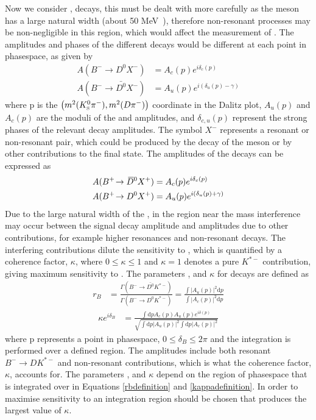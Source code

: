 Now we consider \decay{\Bm}{\D\Kstarm}, \decay{\Kstarm}{\KS\pim} decays, this must be dealt with more carefully as the \Kstarm meson has a large natural width (about 50 MeV~\cite{PDG2016}), therefore non-resonant \decay{\Bm}{\D\KS\pim} processes may be non-negligible in this region, which would affect the measurement of \Pgamma. The amplitudes and phases of the different decays would be different at each point in \decay{\Bm}{\D\KS\pim} phasespace, as given by
\begin{align*}
A(B^- \to D^0 X^-) &= A_c(p) e^{i\delta_c(p)} \\
A(B^- \to \bar{D^0} X^-) &= A_u(p) e^{i(\delta_u(p) - \gamma)}
\end{align*}
where p is the $\left(m^2({{K}^0_{\mathrm{ \scriptscriptstyle S}}}{{\pi}^-}),m^2({D}{{\pi}^-})\right)$ coordinate in the \decay{\Bm}{\D\KS\pim} Dalitz plot, $A_u(p)$ and $A_c(p)$ are the moduli of the \decay{\bquark}{\uquark} and \decay{\bquark}{\cquark} amplitudes, and $\delta_{c,u}(p)$ represent the strong phases of the relevant decay amplitudes. The symbol $X^-$ represents a resonant or non-resonant \KS\pim pair, which could be produced by the decay of the \Kstarm meson or by other contributions to the \decay{\Bm}{\D\KS\pim} final state. The amplitudes of the \Bp decays can be expressed as 
\begin{align*}
A({{{B}^+}}\!\rightarrow {\ensuremath{{\kern 0.2em\overline{\kern -0.2em D}{}}{}^0}} X^+) &= A_c(p) e^{i\delta_c(p)} \\
A({{{B}^+}}\!\rightarrow {\ensuremath{{D}^0}} X^+) &= A_u(p) e^{i(\delta_u(p) + \gamma)}
\end{align*}
Due to the large natural width of the \Kstarm, in the region near the \Kstarm mass interference may occur between the signal \Kstarm decay amplitude and amplitudes due to other \decay{\Bm}{\D\KS\pim} contributions, for example higher \KS\pim resonances and non-resonant decays. The interfering contributions dilute the sensitivity to \Pgamma, which is quantified by a coherence factor, $\kappa$, where $0 \leq \kappa \leq 1$ and $\kappa = 1$ denotes a pure $K^{*-}$ contribution, giving maximum sensitivity to \Pgamma. The parameters \rb, \deltab and $\kappa$ for \btodkst decays are defined as
\begin{align}
r_B &= \frac{\Gamma(B^- \to \bar{D^0}K^{*-})}{\Gamma(B^- \to D^0K^{*-})} = \frac{\int \left|A_u(p)\right|^2 \mathrm{d}p}{\int \left|A_c(p)\right|^2 \mathrm{d}p}
\label{rbdefinition}
\end{align}
\begin{align}
\kappa e^{i\delta_B} &= \frac{\int \mathrm{d}p A_c(p)A_u(p)e^{i\delta(p)}}{\sqrt{\int \mathrm{d}p \left|A_u(p)\right|^2 \int \mathrm{d}p \left|A_c(p)\right|^2}}
\label{kappadefinition}
\end{align}
where p represents a point in phasespace, $0 \leq \delta_B \leq 2\pi$ and the integration is performed over a defined \Kstarm region. The amplitudes include both resonant $B^- \to DK^{*-}$ and non-resonant \decay{\Bm}{\D\KS\pim} contributions, which is what the coherence factor, $\kappa$, accounts for. The parameters \rb, \deltab and $\kappa$ depend on the region of \decay{\Bm}{\D\KS\pim} phasespace that is integrated over in Equations \ref{rbdefinition} and \ref{kappadefinition}. In order to maximise sensitivity to \Pgamma an integration region should be chosen that produces the largest value of $\kappa$.


